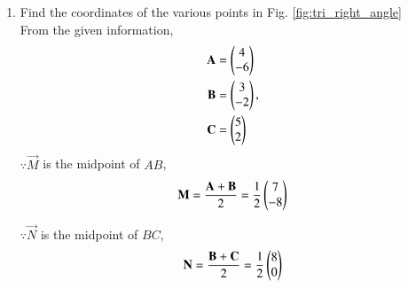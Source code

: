 \begin{enumerate}[label=\thesection.\arabic*.,ref=\thesection.\theenumi]
%
\item Find the coordinates of the various points in Fig. \ref{fig:tri_right_angle}
\label{const:tri_right_angle}
\\
%
\solution From the given information, 
\begin{align}
\label{eq:constr_a}
\mathbf{A} &= \begin{pmatrix}4\\-6\end{pmatrix} 
\\
\mathbf{B} &= \begin{pmatrix}3\\-2\end{pmatrix}, 
\label{eq:constr_b}
\\
\mathbf{C} &= \begin{pmatrix}5\\2\end{pmatrix}
\label{eq:constr_c}
\end{align}
$\because \vec{M}$ is the midpoint of $AB$,
\begin{align}
\mathbf{M}= \frac{\mathbf{A}+\mathbf{B}}{2} = \frac{1}{2}\begin{pmatrix}7\\-8\end{pmatrix}
\label{eq:constr_m}
\end{align}

$\because \vec{N}$ is the midpoint of $BC$,
\begin{align}
\mathbf{N}= \frac{\mathbf{B}+\mathbf{C}}{2} = \frac{1}{2}\begin{pmatrix}8\\0\end{pmatrix}
\label{eq:constr_n}
\end{align}


\end{enumerate}
